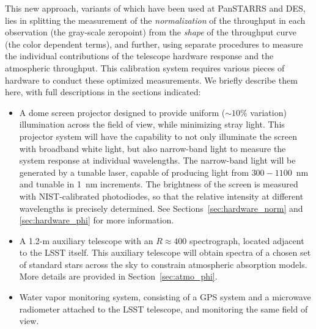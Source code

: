 \documentclass[12pt,preprint]{aastex}
\begin{document}
This new approach, variants of which have been used at PanSTARRS and DES, lies in splitting the measurement of the {\it
normalization} of the throughput in each observation (the gray-scale
zeropoint) from the {\it shape} of the throughput curve (the color
dependent terms), and further, using separate procedures to measure
the individual contributions of the telescope hardware response and
the atmospheric throughput. This calibration system requires various
pieces of hardware to conduct these optimized measurements. We briefly
describe them here, with full descriptions in the sections indicated:
\begin{itemize}
\item{A dome screen projector designed to provide uniform
    ($\sim10\%$ variation) illumination across the field of view, while
    minimizing stray light. This projector system will have the
    capability to not only illuminate the screen with broadband white
    light, but also narrow-band light to measure the system response
    at individual wavelengths. The narrow-band light will be generated
    by a tunable laser, capable of producing light from $300-1100$~nm
    and tunable in 1~nm increments. The brightness of the screen is measured 
    with NIST-calibrated photodiodes, so that the relative intensity at different 
    wavelengths is precisely determined.  See
    Sections~\ref{sec:hardware_norm} and \ref{sec:hardware_phi} for
    more information.}
\item{A 1.2-m auxiliary telescope with an $R \approx 400$ spectrograph,
    located adjacent to the LSST itself. This auxiliary telescope will
    obtain spectra of a chosen set of standard stars across the sky to
    constrain atmospheric absorption models. More details are provided
  in Section~\ref{sec:atmo_phi}.}
\item{Water vapor monitoring system, consisting of a GPS system and a 
    microwave radiometer attached to the LSST telescope, and monitoring 
    the same field of view.}  
\end{itemize}
\end{document}
